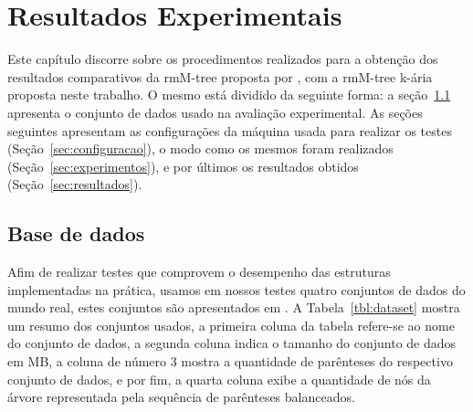 \chapter{Resultados Experimentais}\label{chp:resultados}

Este capítulo discorre sobre os procedimentos realizados para a obtenção dos resultados comparativos da rmM-tree proposta por \citet{paper-fully-functinal-succint-trees},
com a rmM-tree k-ária proposta neste trabalho. O mesmo está dividido da seguinte forma: a seção~\ref{sec:base-de-dados} apresenta o conjunto de dados usado na avaliação experimental.
As seções seguintes apresentam as configurações da máquina usada para realizar os testes (Seção~\ref{sec:configuracao}), o modo como os mesmos foram realizados (Seção~\ref{sec:experimentos}),
e por últimos os resultados obtidos (Seção~\ref{sec:resultados}).


\section{Base de dados}\label{sec:base-de-dados}
Afim de realizar testes que comprovem o desempenho das estruturas implementadas na prática, usamos em nossos testes quatro conjuntos de dados do mundo real, estes conjuntos são apresentados em \citet{datasets-inf-udec}.
A Tabela~\ref{tbl:dataset} mostra um resumo dos conjuntos usados, a primeira coluna da tabela refere-se ao nome do conjunto de dados, a segunda coluna indica o tamanho do conjunto de dados em MB, a coluna de número 3 mostra a quantidade de parênteses do respectivo conjunto de dados, e por fim, a quarta coluna exibe a quantidade de nós da árvore representada pela sequência de parênteses balanceados.


